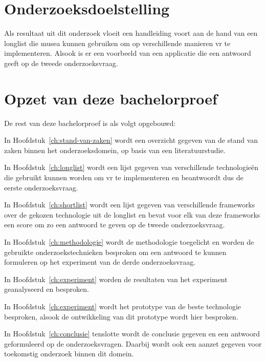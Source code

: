 \section{Onderzoeksdoelstelling}
\label{sec:onderzoeksdoelstelling}

Als resultaat uit dit onderzoek vloeit een handleiding voort aan de hand van een longlist die musea kunnen gebruiken om op verschillende manieren \acrshort{vr} te implementeren. Alsook is er een voorbeeld van een applicatie die een antwoord geeft op de tweede onderzoeksvraag.

\section{Opzet van deze bachelorproef}
\label{sec:opzet-bachelorproef}


De rest van deze bachelorproef is als volgt opgebouwd:

In Hoofdstuk~\ref{ch:stand-van-zaken} wordt een overzicht gegeven van de stand van zaken binnen het onderzoeksdomein, op basis van een literatuurstudie.

In Hoofdstuk~\ref{ch:longlist} wordt een lijst gegeven van verschillende technologieën die gebruikt kunnen worden om \acrshort{vr} te implementeren en beantwoordt dus de eerste onderzoeksvraag.

In Hoofdstuk~\ref{ch:shortlist} wordt een lijst gegeven van verschillende frameworks over de gekozen technologie uit de longlist en bevat voor elk van deze frameworks een score om zo een antwoord te geven op de tweede onderzoeksvraag.

In Hoofdstuk~\ref{ch:methodologie} wordt de methodologie toegelicht en worden de gebruikte onderzoekstechnieken besproken om een antwoord te kunnen formuleren op het experiment van de derde onderzoeksvraag.

In Hoofdstuk~\ref{ch:experiment} worden de resultaten van het experiment geanalyseerd en besproken.

In Hoofdstuk~\ref{ch:experiment} wordt het prototype van de beste technologie besproken, alsook de ontwikkeling van dit prototype wordt hier besproken.

In Hoofdstuk~\ref{ch:conclusie} tenslotte wordt de conclusie gegeven en een antwoord geformuleerd op de onderzoeksvragen. Daarbij wordt ook een aanzet gegeven voor toekomstig onderzoek binnen dit domein.

